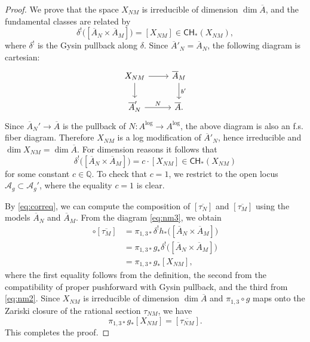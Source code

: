 \documentclass[11pt]{article}
\def\CH{\mathsf{CH}}
\def\A{\mathcal{A}}
\def\QQ{\mathbb{Q}}
\renewcommand{\log}{\mathrm{log}}
\newcommand{\barA}{\overline{A}}
\newcommand{\logA}{{A^{\log}}}
\theoremstyle{definition}
\begin{document}
\begin{proof}
    We prove that the space $X_{NM}$ is irreducible of dimension $\dim \barA$, and the fundamental classes are related by
    \begin{equation}\label{eq:nm2}
        \delta^! \big( [\barA_N \times \barA_M] \big) = [X_{NM}]
        \in \CH_*(X_{NM}),
    \end{equation}
    where $\delta^!$ is the Gysin pullback along $\delta$.
    Since $\barA'_N = \barA_N$, the following diagram is cartesian:
    \[
    \begin{tikzcd}
        X_{NM} \ar[d] \ar[r] & \barA_M \ar[d,"b'"]\\
        \barA'_N \ar[r,"N"] & \barA .
    \end{tikzcd}
    \]
    Since $\barA_N' \to \barA$ is the pullback of $N : \logA \to \logA$, the above diagram is also an f.s. fiber diagram. Therefore $X_{NM}$ is a log modification of $\barA'_N$, hence irreducible and $\dim X_{NM} = \dim \barA$. For dimension reasons it follows that
    \[
    \delta^! \big([\barA_N \times \barA_M] \big) = c \cdot [X_{NM}] \in \CH_*(X_{NM})
    \]
    for some constant $c \in \QQ$. To check that $c=1$, we restrict to the
    open locus $\A_g \subset \A_g'$, where the equality $c=1$ is clear.

    By \eqref{eq:correq}, we can compute the composition of $[\overline{\tau_N}]$ and $[\overline{\tau_M}]$ using the models $\barA_N$ and $\barA_M$. From the diagram \eqref{eq:nm3}, we obtain
    \begin{align*}
        [\overline{\tau_N}] \circ [\overline{\tau_M}]
        &= \pi_{1,3*} \delta^! h_*\bigl([\barA_N \times \barA_M]\bigr) \\
        &= \pi_{1,3*} g_* \delta^!\bigl([\barA_N \times \barA_M]\bigr) \\
        &= \pi_{1,3*} g_*[X_{NM}],
    \end{align*}
    where the first equality follows from the definition, the second from the compatibility of proper pushforward with Gysin pullback, and the third from \eqref{eq:nm2}. Since $X_{NM}$ is irreducible of dimension $\dim \barA$ and $\pi_{1,3}\circ g$ maps onto the Zariski closure of the rational section $\tau_{NM}$, we have
    \[
    \pi_{1,3*}g_*[X_{NM}] = [\overline{\tau_{NM}}].
    \]
    This completes the proof.
\end{proof}
\end{document}
